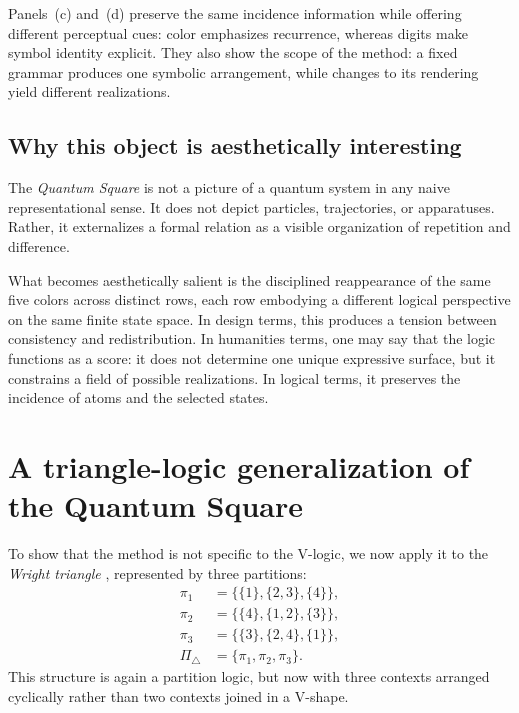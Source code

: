 \documentclass[
  10pt,
  twocolumn,
  aps,
  pra,
  showkeys,
  amsmath,amssymb,
  longbibliography
]{revtex4-2}
\begin{document}
Panels~(c) and~(d) preserve the same incidence information while offering different perceptual cues: color emphasizes recurrence, whereas digits make symbol identity explicit. They also show the scope of the method: a fixed grammar produces one symbolic arrangement, while changes to its rendering yield different realizations.

\subsection{Why this object is aesthetically interesting}

The \emph{Quantum Square} is not a picture of a quantum system in any naive representational sense. It does not depict particles, trajectories, or apparatuses. Rather, it externalizes a formal relation as a visible organization of repetition and difference.

What becomes aesthetically salient is the disciplined reappearance of the same five colors across distinct rows, each row embodying a different logical perspective on the same finite state space. In design terms, this produces a tension between consistency and redistribution. In humanities terms, one may say that the logic functions as a score: it does not determine one unique expressive surface, but it constrains a field of possible realizations. In logical terms, it preserves the incidence of atoms and the selected states.

\section{A triangle-logic generalization of the Quantum Square}

To show that the method is not specific to the V-logic, we now apply it to the \emph{Wright triangle} \cite{dvur-pul-svo,wright}, represented by three partitions:
\begin{equation}
\begin{aligned}
\pi_1&=\{\{1\},\{2,3\},\{4\}\},\\
\pi_2&=\{\{4\},\{1,2\},\{3\}\},\\
\pi_3&=\{\{3\},\{2,4\},\{1\}\},\\
\Pi_{\triangle}&=\{\pi_1,\pi_2,\pi_3\}.
\end{aligned}
\label{eq:trianglepartitions}
\end{equation}
This structure is again a partition logic, but now with three contexts arranged cyclically rather than two contexts joined in a V-shape.
\end{document}
